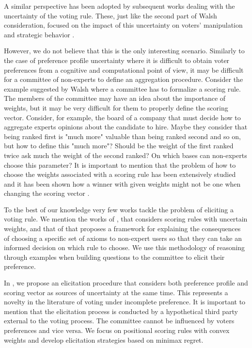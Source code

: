 A similar perspective has been adopted by subsequent works dealing with the uncertainty of the voting rule. These, just like the second part of Walsh consideration, focused on the impact of this uncertainty on voters' manipulation and strategic behavior \citep{Baumeister2011,Elkind2012,Holliday2019}.

However, we do not believe that this is the only interesting scenario. Similarly to the case of preference profile uncertainty where it is difficult to obtain voter preferences from a cognitive and computational point of view, it may be difficult for a committee of non-experts to define an aggregation procedure. 
Consider the example suggested by Walsh where a committee has to formalize a scoring rule. The members of the committee may have an idea about the importance of weights, but it may be very difficult for them to properly define the scoring vector. 
Consider, for example, the board of a company that must decide how to aggregate experts opinions about the candidate to hire. Maybe they consider that being ranked first is "much more" valuable than being ranked second and so on, but how to define this "much more"? Should be the weight of the first ranked twice ask much the weight of the second ranked? On which bases can non-experts choose this parameter?
It is important to mention that the problem of how to choose the weights associated with a scoring rule has been extensively studied and it has been shown how a winner with given weights might not be one when changing the scoring vector \citep{Cook1990,Llamazares2013,Llamazares2016}. 

To the best of our knowledge very few works tackle the problem of eliciting a voting rule. We mention the works of \citet{Llamazares2013,Viappiani2018}, that considers scoring rules with uncertain weights, and that of \citet{Cailloux2014} that proposes a framework for explaining the consequences of choosing a specific set of axioms to non-expert users so that they can take an informed decision on which rule to choose.
We use this methodology of reasoning through examples when building questions to the committee to elicit their preference.

In , we propose an elicitation procedure that considers both preference profile and scoring vector as sources of uncertainty at the same time. This represents a novelty in the literature of voting under incomplete preference. It is important to mention that the elicitation process is conducted by a hypothetical third party external to the voting process. The committee cannot be influenced by voters preferences and vice versa. 
We focus on positional scoring rules with convex weights and develop elicitation strategies based on minimax regret. 


